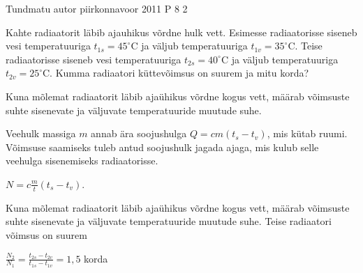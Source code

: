 {Tundmatu autor} %
{piirkonnavoor} %
{2011} %
{P 8} %
{2} %
{

\ifStatement
Kahte radiaatorit läbib ajauhikus võrdne hulk vett. Esimesse radiaatorisse siseneb vesi temperatuuriga $t_{1s} = 45^{\circ}$C ja väljub temperatuuriga $t_{1v} = 35^{\circ}$C. Teise radiaatorisse siseneb vesi temperatuuriga $t_{2s} = 40^{\circ}$C ja väljub temperatuuriga $t_{2v} = 25^{\circ}$C. Kumma radiaatori küttevõimsus on suurem ja mitu korda?
\fi

\ifHint
Kuna mõlemat radiaatorit läbib ajaühikus võrdne kogus vett, määrab võimsuste suhte sisenevate ja väljuvate temperatuuride muutude suhe.
\fi

\ifSolution
Veehulk massiga $m$ annab ära soojushulga $Q = cm(t_s - t_v)$, mis kütab ruumi. Võimsuse saamiseks tuleb antud soojushulk jagada ajaga, mis kulub selle veehulga sisenemiseks radiaatorisse.
\begin{center}
$N = c\frac{m}{t}(t_s - t_v)$.
\end{center}
Kuna mõlemat radiaatorit läbib ajaühikus võrdne kogus vett, määrab võimsuste suhte sisenevate ja väljuvate temperatuuride muutude suhe. Teise radiaatori võimsus on suurem
\begin{center}
$\frac{N_2}{N_1} = \frac{t_{2s} - t_{2v}}{t_{1s} - t_{1v}} = 1,5$ korda
\end{center}
\fi
}